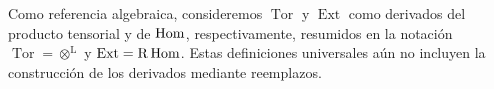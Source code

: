 Como referencia algebraica, consideremos $\operatorname{Tor}$ y $\operatorname{Ext}$ como derivados del producto tensorial y de $\operatorname{Hom}$, respectivamente, resumidos en la notación $\operatorname{Tor}=\otimes^{\mathrm L}$ y $\operatorname{Ext}=\mathrm R\operatorname{Hom}$. Estas definiciones universales aún no incluyen la construcción de los derivados mediante reemplazos.
